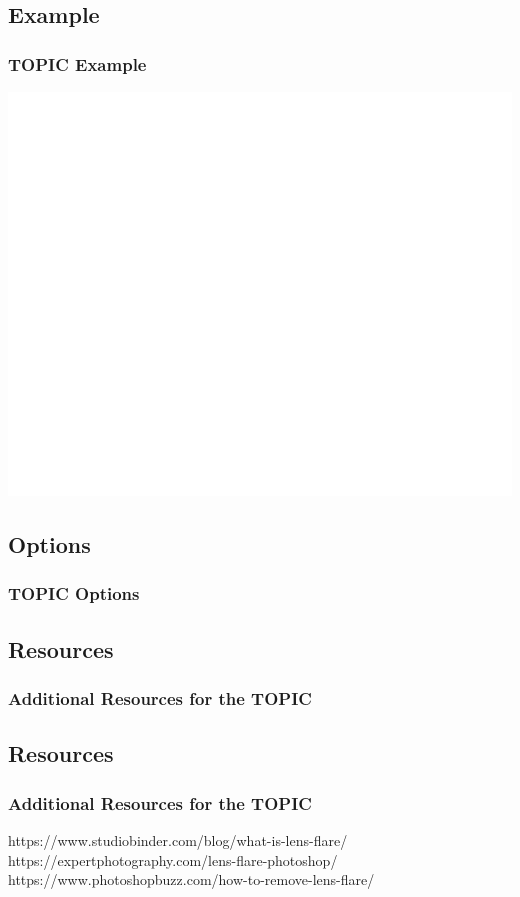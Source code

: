 \documentclass{beamer}
\begin{document}
\subsection{Example}		
\begin{frame}
	\frametitle{TOPIC Example}
	\begin{center}
		\includegraphics[width=1.0\textwidth]{images/TOPIC example.png}
	\end{center}
\end{frame}

\subsection{Options}		
\begin{frame}
	\frametitle{TOPIC Options}
	\begin{outline}
		\1 
	\end{outline}
\end{frame}

\subsection{Resources}		
\begin{frame}
	\frametitle{Additional Resources for the TOPIC}
	\begin{outline}
		\1 
		\2 
		\2
	\end{outline}
\end{frame}


\subsection{Resources}		
\begin{frame}
	\frametitle{Additional Resources for the TOPIC}
	\begin{outline}
		\1 https://www.studiobinder.com/blog/what-is-lens-flare/
		\2 
		\2
		\1 https://expertphotography.com/lens-flare-photoshop/
		\2 
		\2
		\1 
		\2 
		\2https://www.photoshopbuzz.com/how-to-remove-lens-flare/
		\1 
		\2 
		\2
		\1 
		\2 
		\2
	\end{outline}
\end{frame}

	
\end{document}
